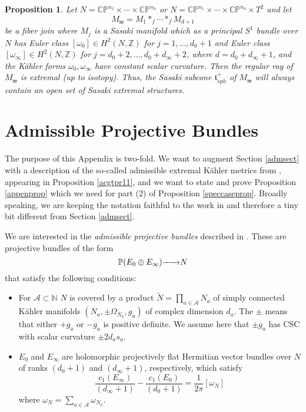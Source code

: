 \documentclass[12pt]{amsart}
\newtheorem{proposition}[theorem]{Proposition}
\def\bbc{{\mathbb C}}
\def\bbn{{\mathbb N}}
\def\bbp{{\mathbb P}}
\def\bbz{{\mathbb Z}}
\def\gro{\omega}
\def\cala{{\mathcal A}}
\def\ra#1{\hbox to #1pc{\rightarrowfill}}
\def\gt{{\mathfrak t}}
\def\gw{{\mathfrak w}}
\begin{document}
\begin{proposition}
Let $N=\bbc\bbp^{n_1}\times \cdots \times \bbc\bbp^{n_k}$ or $N=\bbc\bbp^{n_1}\times \cdots \times \bbc\bbp^{n_k} \times T^2$ and let
$$M_\gw=M_{1}*_f \cdots *_fM_{d+1}$$ 
be a fiber join where $M_{j}$ is a Sasaki manifold which as a principal $S^1$ bundle over $N$
has Euler class $[\gro_{0}] \in H^2(N,\bbz)$ for $j=1,\dots,d_0+1$ and Euler class $[\gro_{\infty}] \in H^2(N,\bbz)$ for
$j=d_0+2,\dots,d_0+ d_\infty+2$, where $d=d_0+d_\infty+1$, and the K\"ahler forms $\gro_{0},\gro_{\infty}$ have constant scalar curvature. Then the regular ray of $M_\gw$ is extremal (up to isotopy). Thus, the Sasaki subcone $\gt^+_{sph}$ of $M_\gw$ will always contain an open set of Sasaki extremal structures.
\end{proposition}

\appendix
\section{Admissible Projective Bundles}\label{APB}
The purpose of this Appendix is two-fold. We want to augment Section \ref{admsect} with a description of the so-called admissible extremal K\"ahler metrics from \cite{ACGT08}, appearing in Proposition \ref{acgtpr11}, and we want to state and prove Proposition \ref{appenprop} which we need for part (2) of Proposition \ref{speccaseprop}. Broadly speaking, we are keeping the notation faithful to the work in \cite{ACGT08} and therefore a tiny bit different from Section \ref{admsect}.

We are interested in the {\it admissible projective bundles} described in \cite{ACGT08}. These are projective bundles of the form 
$$\bbp(E_0\oplus E_\infty)\ra{1.8} N$$ 
that satisfy the following conditions:
\begin{itemize}
\item For $\cala \subset \bbn$ $N$ is covered by a product ${\tilde{N}}=\prod_{a\in \cala} N_a$ of simply connected K\"ahler manifolds $(N_a,\pm \Omega_{N_a},g_a)$ of complex dimension $d_a$. The $\pm$ means that either $+g_a$ or $-g_a$ is positive definite. We assume here that $\pm g_a$ has CSC with scalar curvature $\pm 2 d_a s_a$.
\item $E_0$ and $E_\infty$ are holomorphic projectively flat Hermitian vector bundles over $N$ of ranks $(d_0+1)$ and $(d_\infty+1)$, respectively, which satisfy
$$\frac{c_1(E_\infty)}{(d_\infty+1)}-\frac{c_1(E_0)}{(d_0+1)}=\frac{1}{2\pi}[\gro_N]$$
where $\gro_N=\sum_{a\in \cala}\gro_{N_a}$.
\end{itemize}
\end{document}
